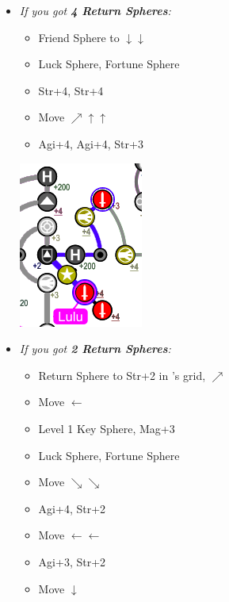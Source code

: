 \begin{spheregrid}
	\begin{itemize}
		\yunaf
		\begin{itemize}
			\item \textit{If you got \textbf{4 Return Spheres}:}
			      \begin{itemize}
				      \item Friend Sphere to \lulu $\downarrow\downarrow$
				      \item Luck Sphere, Fortune Sphere
				      \item Str+4, Str+4
				      \item Move $\nearrow\uparrow\uparrow$
				      \item Agi+4, Agi+4, Str+3
			      \end{itemize}
			      \includegraphics[width=.5\columnwidth]{graphics/4_returns_w_luck_pt1}
			      \columnbreak
			\item \textit{If you got \textbf{2 Return Spheres}:}
			      \begin{itemize}
				      \item Return Sphere to Str+2 in \wakka's grid, $\nearrow$
				      \item Move $\leftarrow$
				      \item Level 1 Key Sphere, Mag+3
				      \item Luck Sphere, Fortune Sphere
				      \item Move $\searrow\searrow$
				      \item Agi+4, Str+2
				      \item Move $\leftarrow\leftarrow$
				      \item Agi+3, Str+2
				      \item Move $\downarrow$

\end{itemize}
\end{itemize}
\end{itemize}
\end{spheregrid}
